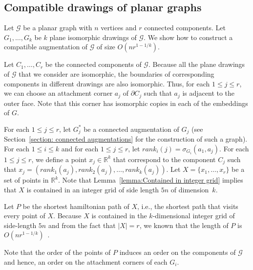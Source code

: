 \documentclass[a4paper, 11pt]{article}
\begin{document}
\subsection{Compatible drawings of planar graphs}
Let $\mathcal G$ be a planar graph with $n$ vertices and $r$ connected components.
Let $G_1, \ldots, G_k$ be $k$ plane isomorphic drawings of $\mathcal G$. 
We show how to construct a compatible augmentation of $\mathcal G$ of size $O(nr^{1-1/k})$.

Let $C_1, \ldots, C_r$ be the connected components of $\mathcal G$.
Because all the plane drawings of $\mathcal G$ that we consider are isomorphic, the boundaries of corresponding components in different drawings are also isomorphic. Thus, for each $1\leq j\leq r$, we can choose an attachment corner $a_j$ of $\partial C_j$ such that $a_j$ is adjacent to the outer face. Note that this corner has isomorphic copies in each of the embeddings of $G$.

For each $1\leq j\leq r$, let $G_j^*$ be a connected augmentation of $G_j$ (see Section~\ref{section: connected augmentations} for the construction of such a graph).
For each $1\leq i\leq k$ and for each $1\leq j\leq r$, let $rank_i(j) = \sigma_{G_i}(a_1, a_j)$.
For each $1\leq j\leq r$, we define a point $x_j\in \mathbb{R}^k$ that correspond to the component $C_j$ such that 
$x_j = (rank_1(a_j), rank_2(a_j), \ldots, rank_k(a_j))$. Let $X = \{x_1, \ldots, x_r\}$ be a set of points in $\mathbb{R}^k$. 
Note that Lemma~\ref{lemma:Contained in integer grid} implies that $X$ is contained in an integer grid of side length $5n$ of dimension~$k$.

Let $P$ be the shortest hamiltonian path of $X$, i.e., the shortest path that visits every point of $X$.
Because $X$ is contained in the $k$-dimensional integer grid of side-length $5n$ and from the fact that $|X| = r$, we known that the length of $P$ is $O(nr^{1-1/k})$~\cite{}.

Note that the order of the points of $P$ induces an order on the components of $\mathcal G$ and hence, an order on the attachment corners of each $G_i$. 
\end{document}
